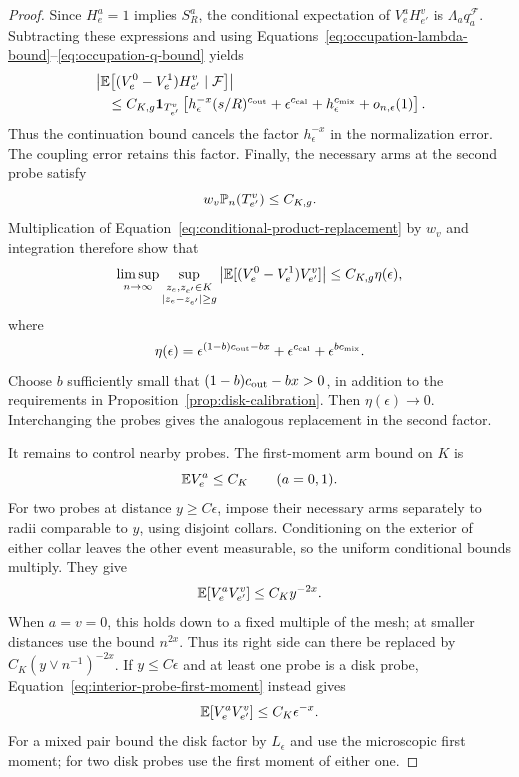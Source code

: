 \begin{proof}
Since $H_e^a=1$ implies $S_R^a$, the conditional expectation of
$V_e^aH_{e'}^v$ is $\Lambda_aq_a^{\mathcal F}$.  Subtracting these
expressions and using
Equations~\eqref{eq:occupation-lambda-bound}--\eqref{eq:occupation-q-bound}
yields
\begin{align}
 &\left|\mathbb E\bigl[(V_e^0-V_e^1)H_{e'}^v\mid\mathcal F\bigr]\right|
 \nonumber\\
 &\quad\le C_{K,g}\mathbf 1_{T_{e'}^v}
 \left[h_\epsilon^{-x}(s/R)^{c_{\rm out}}
       +\epsilon^{c_{\rm cal}}+h_\epsilon^{c_{\rm mix}}
       +o_{n,\epsilon}(1)\right].
 \label{eq:conditional-product-replacement}
\end{align}
Thus the continuation bound cancels the factor $h_\epsilon^{-x}$ in
the normalization error.  The coupling error retains this factor.
Finally, the necessary arms at the second probe satisfy
\[
 w_v\mathbb P_n(T_{e'}^v)\le C_{K,g}.
\]
Multiplication of Equation~\eqref{eq:conditional-product-replacement}
by $w_v$ and integration therefore show that
\begin{equation}
 \limsup_{n\to\infty}
 \sup_{\substack{z_e,z_{e'}\in K\\|z_e-z_{e'}|\ge g}}
 \left|\mathbb E[(V_e^0-V_e^1)V_{e'}^v]\right|
 \le C_{K,g}\eta(\epsilon),
 \label{eq:separated-product-replacement}
\end{equation}
where
\[
 \eta(\epsilon)=\epsilon^{(1-b)c_{\rm out}-bx}
                +\epsilon^{c_{\rm cal}}
                +\epsilon^{bc_{\rm mix}}.
\]
Choose $b$ sufficiently small that
$(1-b)c_{\rm out}-bx>0$, in addition to the requirements in
Proposition~\ref{prop:disk-calibration}.  Then
$\eta(\epsilon)\to0$.  Interchanging the probes gives the analogous
replacement in the second factor.

It remains to control nearby probes.  The first-moment arm bound on
$K$ is
\begin{equation}
 \mathbb E V_e^a\le C_K\qquad(a=0,1).
 \label{eq:interior-probe-first-moment}
\end{equation}
For two probes at distance $y\ge C\epsilon$, impose their necessary
arms separately to radii comparable to $y$, using disjoint collars.
Conditioning on the exterior of either collar leaves the other event
measurable, so the uniform conditional bounds multiply.  They give
\begin{equation}
 \mathbb E[V_e^aV_{e'}^v]\le C_K y^{-2x}.
 \label{eq:probe-pair-bound}
\end{equation}
When $a=v=0$, this holds down to a fixed multiple of the mesh; at
smaller distances use the bound $n^{2x}$.  Thus its right side can
there be replaced by $C_K(y\vee n^{-1})^{-2x}$.
If $y\le C\epsilon$ and at least one probe is a disk probe,
Equation~\eqref{eq:interior-probe-first-moment} instead gives
\begin{equation}
 \mathbb E[V_e^aV_{e'}^v]\le C_K\epsilon^{-x}.
 \label{eq:overlapping-disk-bound}
\end{equation}
For a mixed pair bound the disk factor by $L_\epsilon$ and use the
microscopic first moment; for two disk probes use the first moment of
either one.


\end{proof}
